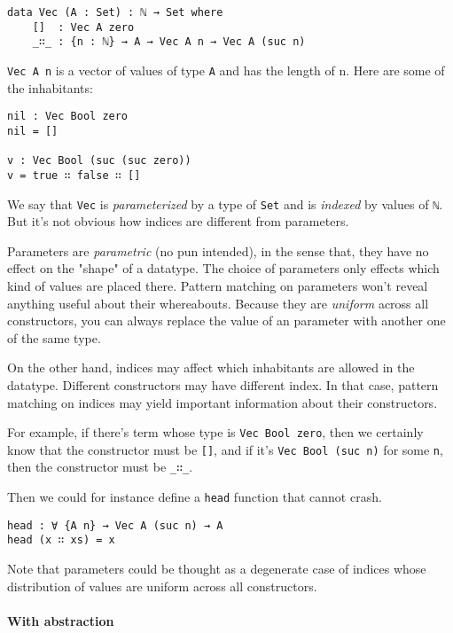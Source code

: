 \documentclass[12pt, a4paper]{article}
\begin{document}
\begin{lstlisting}
data Vec (A : Set) : ℕ → Set where
    []  : Vec A zero
    _∷_ : {n : ℕ} → A → Vec A n → Vec A (suc n)
\end{lstlisting}

{\lstinline|Vec A n|} is a vector of values of type {\lstinline|A|} and
has the length of n. Here are some of the inhabitants:

\begin{lstlisting}
nil : Vec Bool zero
nil = []

v : Vec Bool (suc (suc zero))
v = true ∷ false ∷ []
\end{lstlisting}

We say that {\lstinline|Vec|} is \textit{parameterized} by a type of {\lstinline|Set|}
and is \textit{indexed} by values of {\lstinline|ℕ|}. But it's not obvious how indices are
different from parameters.

Parameters are \textit{parametric} (no pun intended), in the sense that, they
have no effect on the "shape" of a datatype. The choice of parameters only effects
which kind of values are placed there. Pattern matching on parameters won't reveal
anything useful about their whereabouts. Because they are \textit{uniform} across
all constructors, you can always replace the value of an parameter with another one
of the same type.

On the other hand, indices may affect which inhabitants are allowed in the
datatype. Different constructors may have different index. In that case, pattern
matching on indices may yield important information about their constructors.

For example, if there's term whose type is {\lstinline|Vec Bool zero|}, then
we certainly know that the constructor must be {\lstinline|[]|}, and if it's
{\lstinline|Vec Bool (suc n)|} for some {\lstinline|n|}, then the constructor
must be {\lstinline|_∷_|}.

Then we could for instance define a {\lstinline|head|} function that cannot crash.

\begin{lstlisting}
head : ∀ {A n} → Vec A (suc n) → A
head (x ∷ xs) = x
\end{lstlisting}

Note that parameters could be thought as a degenerate case of indices whose distribution
of values are uniform across all constructors.

\paragraph{With abstraction}
\end{document}
